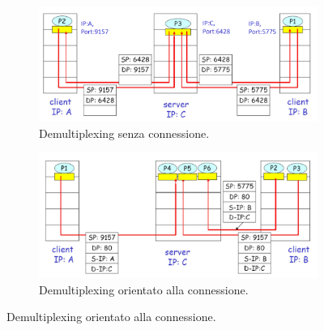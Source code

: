 \documentclass[11pt, italian, openany]{book}
\begin{document}
\begin{sloppypar}
\begin{itemize}[topsep=0pt]
	\begin{figure}[h!]
		\begin{subfigure}{0.49 \linewidth} \centering
			\includegraphics[scale=0.22]{images/demultiplexing-senza-connessione.png}
			\caption{Demultiplexing senza connessione.}
		\end{subfigure}
		\begin{subfigure}{0.49 \linewidth} \centering
			\includegraphics[scale=0.22]{images/demultiplexing-orientato-alla-connessione.png}
			\caption{Demultiplexing orientato alla connessione.}
		\end{subfigure}
	\end{figure}
	

\end{itemize}
\end{sloppypar}
\end{document}
